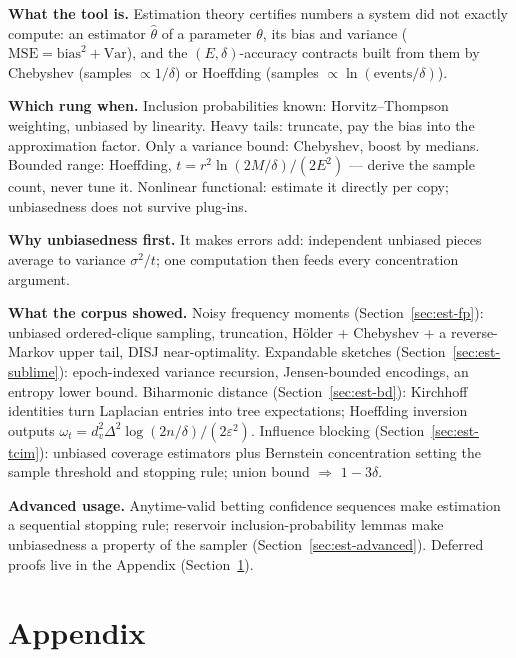 \begin{recap}
\item \textbf{What the tool is.} Estimation theory certifies numbers a system did not exactly
  compute: an estimator $\hat\theta$ of a parameter $\theta$, its bias and variance
  ($\mathrm{MSE} = \text{bias}^2 + \mathrm{Var}$), and the $(E,\delta)$-accuracy contracts
  built from them by Chebyshev (samples $\propto 1/\delta$) or Hoeffding (samples $\propto
  \ln(\text{events}/\delta)$).
\item \textbf{Which rung when.} Inclusion probabilities known: Horvitz--Thompson weighting,
  unbiased by linearity. Heavy tails: truncate, pay the bias into the approximation factor.
  Only a variance bound: Chebyshev, boost by medians. Bounded range: Hoeffding, $t =
  r^2\ln(2M/\delta)/(2E^2)$ --- derive the sample count, never tune it. Nonlinear functional:
  estimate it directly per copy; unbiasedness does not survive plug-ins.
\item \textbf{Why unbiasedness first.} It makes errors add: independent unbiased pieces
  average to variance $\sigma^2/t$; one computation then feeds every concentration argument.
\item \textbf{What the corpus showed.} Noisy frequency moments (Section~\ref{sec:est-fp}):
  unbiased ordered-clique sampling, truncation, H\"older + Chebyshev + a reverse-Markov
  upper tail, DISJ near-optimality. Expandable sketches (Section~\ref{sec:est-sublime}):
  epoch-indexed variance recursion, Jensen-bounded encodings, an entropy lower bound.
  Biharmonic distance (Section~\ref{sec:est-bd}): Kirchhoff identities turn Laplacian
  entries into tree expectations; Hoeffding inversion outputs $\omega_t =
  d_v^2\Delta^2\log(2n/\delta)/(2\varepsilon^2)$. Influence blocking
  (Section~\ref{sec:est-tcim}): unbiased coverage estimators plus Bernstein concentration
  setting the sample threshold and stopping rule; union bound $\Rightarrow$ $1-3\delta$.
\item \textbf{Advanced usage.} Anytime-valid betting confidence sequences make estimation a
  sequential stopping rule; reservoir inclusion-probability lemmas make unbiasedness a
  property of the sampler (Section~\ref{sec:est-advanced}). Deferred proofs live in the
  Appendix (Section~\ref{sec:est-appendix}).
\end{recap}

\section{Appendix}
\label{sec:est-appendix}

